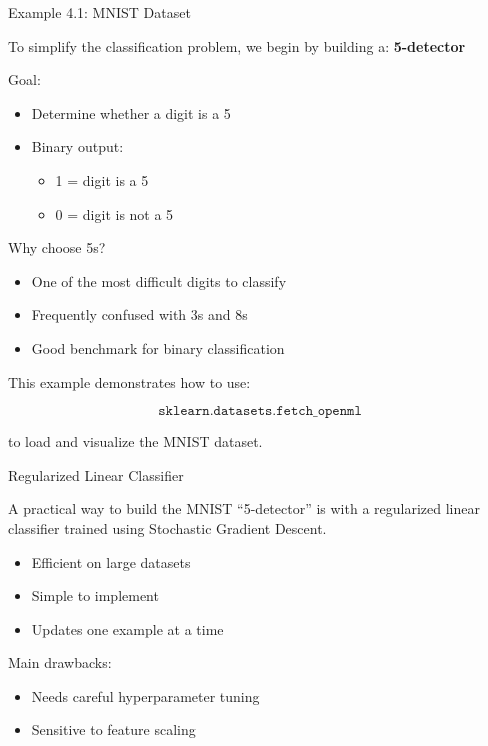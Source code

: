 \documentclass[aspectratio=169]{beamer}
\begin{document}
\begin{frame}{Example 4.1: MNIST Dataset}
	
	To simplify the classification problem, we begin by building a: \textbf{5-detector}
	
	\vspace{0.5em}
	
	Goal:
	\begin{itemize}
		\item Determine whether a digit is a 5
		\item Binary output:
		\begin{itemize}
			\item 1 = digit is a 5
			\item 0 = digit is not a 5
		\end{itemize}
	\end{itemize}
	
	\vspace{0.5em}
	
	Why choose 5s?
	
	\begin{itemize}
		\item One of the most difficult digits to classify
		\item Frequently confused with 3s and 8s
		\item Good benchmark for binary classification
	\end{itemize}
	
	\vspace{0.5em}
	
	This example demonstrates how to use:
	
	\[
	\texttt{sklearn.datasets.fetch\_openml}
	\]
	
	to load and visualize the MNIST dataset.
	
\end{frame}


\begin{frame}{Regularized Linear Classifier}
	
	A practical way to build the MNIST ``5-detector'' is with a regularized linear classifier trained using Stochastic Gradient Descent.
	
	\vspace{0.5em}
	
	\begin{itemize}
		\item Efficient on large datasets
		\item Simple to implement
		\item Updates one example at a time
	\end{itemize}
	
	\vspace{0.5em}
	
	Main drawbacks:
	\begin{itemize}
		\item Needs careful hyperparameter tuning
		\item Sensitive to feature scaling
	\end{itemize}
	
\end{frame}
\end{document}
